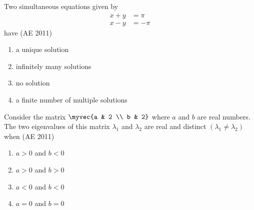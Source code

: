 \item Two simultaneous equations given by 
	\begin{align*}
		x+y&=\pi\\
	x-y&=-\pi 
	\end{align*}
have
\hfill(AE 2011)
\begin{multicols}{2}
\begin{enumerate}
\item a unique solution
\item infinitely many solutions
\item no solution
\item a finite number of multiple solutions
\end{enumerate}
\end{multicols}
\item Consider the matrix $\myvec{a & 2 \\ b & 2}$ where $a$ and $b$ are real numbers. The two eigenvalues of this matrix $\lambda_1$ and $\lambda_2$ are real and distinct $(\lambda_1\neq\lambda_2)$ when
\hfill(AE 2011)
\begin{multicols}{4}
\begin{enumerate}
\item $a>0$ and $b<0$
\item $a>0$ and $b>0$
\item $a<0$ and $b<0$
\item $a=0$ and $b=0$
\end{enumerate}
\end{multicols}


